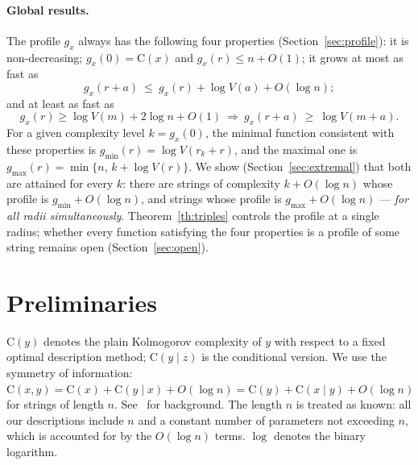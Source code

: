 \documentclass[11pt,a4paper]{article}
\theoremstyle{definition}
\newcommand{\C}{\mathrm{C}}
\renewcommand{\le}{\leqslant}
\renewcommand{\ge}{\geqslant}
\begin{document}
\paragraph{Global results.}
The profile $g_x$ always has the following four properties
(Section~\ref{sec:profile}): it is non-decreasing; $g_x(0)=\C(x)$ and
$g_x(r)\le n+O(1)$; it grows at most as fast as
\[
  g_x(r+a)\ \le\ g_x(r)+\log V(a)+O(\log n);
\]
and at least as fast as
\[
  g_x(r)\ge\log V(m)+2\log n+O(1)\ \Longrightarrow\ g_x(r+a)\ \ge\ \log V(m+a).
\]
For a given complexity level $k=g_x(0)$, the minimal function consistent with
these properties is $g_{\min}(r)=\log V(r_k+r)$, and the maximal one is
$g_{\max}(r)=\min\{n,\,k+\log V(r)\}$. We show
(Section~\ref{sec:extremal}) that both are attained for every $k$: there are
strings of complexity $k+O(\log n)$ whose profile is $g_{\min}+O(\log n)$, and
strings whose profile is $g_{\max}+O(\log n)$ --- \emph{for all radii
simultaneously}. Theorem~\ref{th:triples} controls the profile at a single
radius; whether every function satisfying the four properties is a profile of
some string remains open (Section~\ref{sec:open}).

\section{Preliminaries}\label{sec:prelim}

$\C(y)$ denotes the plain Kolmogorov complexity of $y$ with respect to a fixed
optimal description method; $\C(y\mid z)$ is the conditional version. We use the
symmetry of information: $\C(x,y)=\C(x)+\C(y\mid x)+O(\log n)=\C(y)+\C(x\mid
y)+O(\log n)$ for strings of length $n$. See~\cite{LV08,SUV} for background. The
length $n$ is treated as known: all our descriptions include $n$ and a constant
number of parameters not exceeding $n$, which is accounted for by the
$O(\log n)$ terms. $\log$ denotes the binary logarithm.
\end{document}
